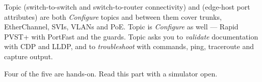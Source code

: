 \begin{examnote}
Topic  (switch-to-switch and switch-to-router connectivity) and
 (edge-host port attributes) are both \emph{Configure} topics and between
them cover trunks, EtherChannel, SVIs, VLANs and PoE. Topic  is
\emph{Configure} as well --- Rapid PVST+ with PortFast and the guards. Topic
 asks you to \emph{validate} documentation with CDP and LLDP, and
 to \emph{troubleshoot} with  commands, ping, traceroute and
capture output.

Four of the five are hands-on. Read this part with a simulator open.
\end{examnote}
